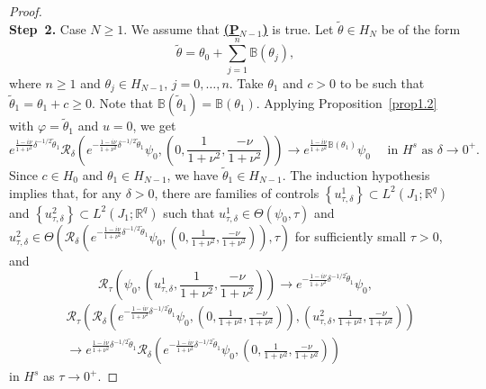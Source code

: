 \documentclass[review]{elsarticle}
\theoremstyle{dotless}
\def \geq{\geqslant}
\numberwithin{equation}{section}
\begin{document}
\begin{proof}
\\
\textbf{Step~2.} Case $N \geq 1$. We assume that \hyperlink{PN}{\textbf{(P$_{N-1}$)}} is true. Let $\tilde{\theta} \in H_N$ be of the form
$$
\tilde{\theta}=\theta_0+\sum_{j=1}^n \mathbb{B}\left(\theta_j\right),
$$
where $n \geq 1$ and $\theta_j \in H_{N-1},\, j=0, \ldots, n$.
Take $ \theta_1 $ and $ c>0 $ to be such that $ \tilde{\theta}_1=\theta_1 +c\geq0 $. Note that $ \mathbb{B}(\tilde{\theta}_1) = \mathbb{B}(\theta_1) $. Applying Proposition~\ref{prop1.2} with $\varphi=\tilde{\theta}_1$ and $u=0$, we get
\begin{equation*}\label{(2.4)}
e^{\frac{1-i\nu}{1+\nu^2}\delta^{-1 / 2} \tilde{\theta}_1} \mathcal{R}_\delta\left(e^{-\frac{1-i\nu}{1+\nu^2} \delta^{-1 / 2} \tilde{\theta}_1} \psi_0, \left(0,\frac{1}{1+\nu^2},\frac{-\nu}{1+\nu^2}\right)\right) \rightarrow e^{\frac{1-i\nu}{1+\nu^2} \mathbb{B}\left(\theta_1\right)} \psi_0 \quad \text { in } H^s \text { as } \delta \rightarrow 0^{+} .
\end{equation*}
Since $ c\in H_0$ and $\theta_1\in H_{N-1} $, we have $ \tilde{\theta}_1\in H_{N-1} $. 
The induction hypothesis implies that, for any $\delta>0$, there are families of controls $\left\{u_{\tau, \delta}^1\right\} \subset L^2\left(J_1 ; \mathbb{R}^q\right)$ and $\left\{u_{\tau, \delta}^2\right\} \subset L^2\left(J_1 ; \mathbb{R}^q\right)$ such that $u_{\tau, \delta}^1 \in \Theta\left(\psi_0, \tau\right)$ and $u_{\tau, \delta}^2 \in \Theta\left(\mathcal{R}_\delta\left(e^{-\frac{1-i\nu}{1+\nu^2} \delta^{-1 / 2} \tilde{\theta}_1} \psi_0, \left(0,\frac{1}{1+\nu^2},\frac{-\nu}{1+\nu^2}\right)\right), \tau\right)$ for sufficiently small $\tau>0$, and
\begin{equation*}\label{(2.5)}
\mathcal{R}_\tau\left(\psi_0, \left(u_{\tau, \delta}^1,\frac{1}{1+\nu^2},\frac{-\nu}{1+\nu^2}\right)\right) \rightarrow e^{-\frac{1-i\nu}{1+\nu^2} \delta^{-1 / 2} \tilde{\theta}_1} \psi_0,
\end{equation*}
\begin{align}
&\mathcal{R}_\tau\left(\mathcal{R}_\delta\left(e^{-\frac{1-i\nu}{1+\nu^2} \delta^{-1 / 2} \tilde{\theta}_1} \psi_0, \left(0,\frac{1}{1+\nu^2},\frac{-\nu}{1+\nu^2}\right)\right), \left(u_{\tau, \delta}^2,\frac{1}{1+\nu^2},\frac{-\nu}{1+\nu^2}\right)\right) \nonumber\\
 &\rightarrow e^{\frac{1-i\nu}{1+\nu^2} \delta^{-1 / 2} \tilde{\theta}_1} \mathcal{R}_\delta\left(e^{-\frac{1-i\nu}{1+\nu^2} \delta^{-1 / 2} \tilde{\theta}_1} \psi_0, \left(0,\frac{1}{1+\nu^2},\frac{-\nu}{1+\nu^2}\right)\right) \nonumber\label{(2.6)}
\end{align}
in $H^s$ as $\tau \rightarrow 0^{+}$. 


\end{proof}
\end{document}
